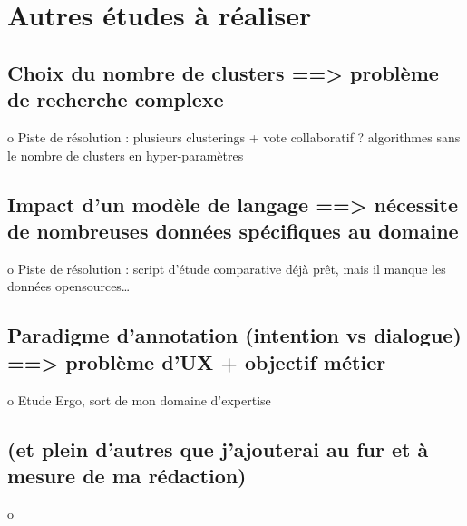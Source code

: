 	\newpage
	


	\newpage
	


	\newpage
	


	\newpage
	


	\newpage
	

	
	\newpage
    \section{Autres études à réaliser}
	\label{section:4.7-ETUDES-DIVERSES}

        \subsection{Choix du nombre de clusters ==> problème de recherche complexe}
            o	Piste de résolution : plusieurs clusterings + vote collaboratif ? algorithmes sans le nombre de clusters en hyper-paramètres

        \subsection{Impact d'un modèle de langage ==> nécessite de nombreuses données spécifiques au domaine}
            o	Piste de résolution : script d'étude comparative déjà prêt, mais il manque les données opensources… 

        \subsection{Paradigme d’annotation (intention vs dialogue) ==> problème d'UX + objectif métier}
            o	Etude Ergo, sort de mon domaine d'expertise

        \subsection{(et plein d'autres que j'ajouterai au fur et à mesure de ma rédaction)}
            o	
